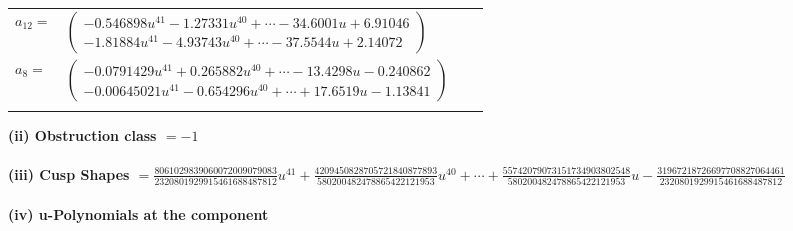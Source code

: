 \documentclass[1p]{elsarticle_modified}
\theoremstyle{definition}
\begin{document}
\begin{tabular}{m{7pt} m{180pt} m{7pt} m{180pt} }
\flushright $a_{12}=$&$\begin{pmatrix}-0.546898 u^{41}-1.27331 u^{40}+\cdots-34.6001 u+6.91046\\-1.81884 u^{41}-4.93743 u^{40}+\cdots-37.5544 u+2.14072\end{pmatrix}$ \\
\flushright $a_{8}=$&$\begin{pmatrix}-0.0791429 u^{41}+0.265882 u^{40}+\cdots-13.4298 u-0.240862\\-0.00645021 u^{41}-0.654296 u^{40}+\cdots+17.6519 u-1.13841\end{pmatrix}$\\&\end{tabular}
\flushleft \textbf{(ii) Obstruction class $= -1$}\\~\\
\flushleft \textbf{(iii) Cusp Shapes $= \frac{8061029839060072009079083}{2320801929915461688487812} u^{41}+\frac{4209450828705721840877893}{580200482478865422121953} u^{40}+\cdots+\frac{55742079073151734903802548}{580200482478865422121953} u-\frac{31967218726697708827064461}{2320801929915461688487812}$}\\~\\
\newpage\renewcommand{\arraystretch}{1}
\flushleft \textbf{(iv) u-Polynomials at the component}\newline \\
\end{document}
